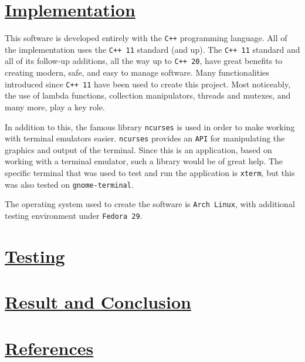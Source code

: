 \documentclass{article}
\newcommand{\code}[1]{\colorbox{codebg}{{\color{black}\texttt{#1}}}}
\begin{document}
\section{\underline{Implementation}}

This software is developed entirely with the \code{C++} programming language. All of the implementation uses the \code{C++ 11} standard (and up). The \code{C++ 11} standard and all of its follow-up additions, all the way up to \code{C++ 20}, have great benefits to creating modern, safe, and easy to manage software. Many functionalities introduced since \code{C++ 11} have been used to create this project. Most noticeably, the use of lambda functions, collection manipulators, threads and mutexes, and many more, play a key role.

In addition to this, the famous library \code{ncurses} is used in order to make working with terminal emulators easier. \code{ncurses} provides an \code{API} for manipulating the graphics and output of the terminal. Since this is an application, based on working with a terminal emulator, such a library would be of great help. The specific terminal that was used to test and run the application is \code{xterm}, but this was also tested on \code{gnome-terminal}.

The operating system used to create the software is \code{Arch Linux}, with additional testing environment under \code{Fedora 29}.

\section{\underline{Testing}}

\section{\underline{Result and Conclusion}}

\section{\underline{References}}
\end{document}
